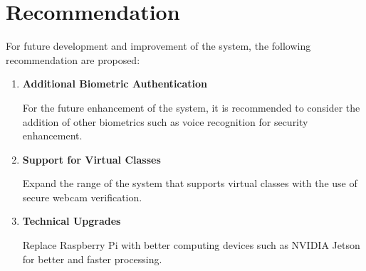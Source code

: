 \section{Recommendation}
	
	For future development and improvement of the system, the following recommendation are proposed:
	
	\begin{enumerate}
		\item \textbf{Additional Biometric Authentication}
	
		For the future enhancement of the system, it is recommended to consider the addition of other biometrics such as voice recognition for security enhancement.
		
		\item \textbf{Support for Virtual Classes}
		
		Expand the range of the system that supports virtual classes with the use of secure webcam verification.
		
		\item \textbf{Technical Upgrades}
		
		Replace Raspberry Pi with better computing devices such as NVIDIA Jetson for better and faster processing.
		
	\end{enumerate}
	